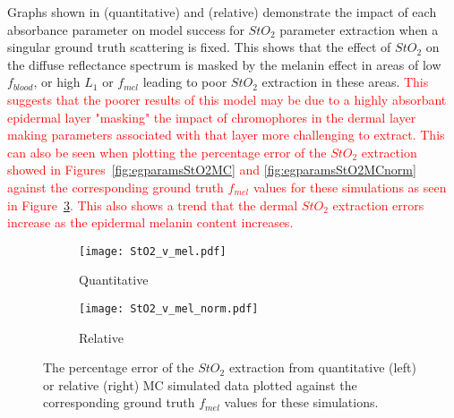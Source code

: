 Graphs shown in  (quantitative) and  (relative) demonstrate the impact of each absorbance parameter on model success for $StO_2$ parameter extraction when a singular ground truth scattering is fixed. This shows that the effect of $StO_2$ on the diffuse reflectance spectrum is masked by the melanin effect in areas of low $f_{blood}$, or high $L_1$ or $f_{mel}$ leading to poor $StO_2$ extraction in these areas. \textcolor{red}{This suggests that the poorer results of this model may be due to a highly absorbant epidermal layer "masking" the impact of chromophores in the dermal layer making parameters associated with that layer more challenging to extract.} \textcolor{red}{This can also be seen when plotting the percentage error of the $StO_2$ extraction showed in Figures~\ref{fig:egparamsStO2MC} and \ref{fig:egparamsStO2MCnorm} against the corresponding ground truth $f_{mel}$ values for these simulations as seen in Figure~\ref{fig:StO2vmel}. This also shows a trend that the dermal $StO_2$ extraction errors increase as the epidermal melanin content increases. }
\begin{figure}[htbp] 
    \centering
    \begin{subfigure}{0.49\textwidth}
        \texttt{[image: StO2\_v\_mel.pdf]}
        \caption{Quantitative}
        \label{fig:StO2vmelQ}
    \end{subfigure}
    \begin{subfigure}{0.49\textwidth}
        \texttt{[image: StO2\_v\_mel\_norm.pdf]}
        \caption{Relative}
        \label{fig:StO2vmelR}
    \end{subfigure}
    \caption{The percentage error of the $StO_2$ extraction from quantitative (left) or relative (right) MC simulated data plotted against the corresponding ground truth $f_{mel}$ values for these simulations.}
    \label{fig:StO2vmel}
\end{figure}
\FloatBarrier

